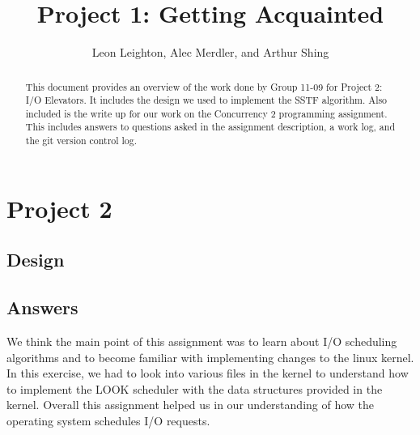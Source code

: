 \documentclass[journal, letterpaper, draftclsnofoot, onecolumn, 10pt]{IEEEtran}
\begin{document}
\title{Project 1: Getting Acquainted}
\author{Leon Leighton, Alec Merdler, and Arthur Shing}

\begin{titlepage}
    \centering
    \maketitle
    \begin{abstract}
      This document provides an overview of the work done by Group 11-09 for Project 2: I/O Elevators.
      It includes the design we used to implement the SSTF algorithm.
      Also included is the write up for our work on the Concurrency 2 programming assignment.
      This includes answers to questions asked in the assignment description, a work log, and the git version control log.
    \end{abstract}


\end{titlepage}
\tableofcontents
\clearpage

\section{Project 2}

\subsection{Design}



\subsection{Answers}


We think the main point of this assignment was to learn about I/O scheduling algorithms and to become familiar with implementing
changes to the linux kernel. In this exercise, we had to look into various files in the kernel to understand how to implement
the LOOK scheduler with the data structures provided in the kernel. Overall this assignment helped us in our understanding of
how the operating system schedules I/O requests.
\end{document}
